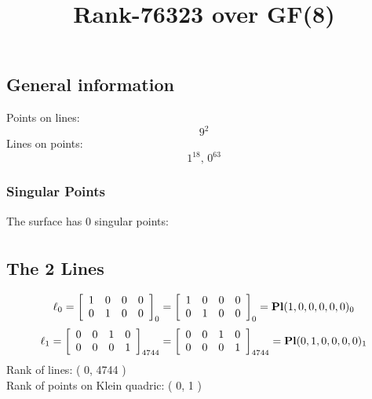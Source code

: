 \documentclass{article}
\newcommand\setTBstruts{\def\T{\rule{0pt}{2.6ex}}%
\def\B{\rule[-1.2ex]{0pt}{0pt}}}
\begin{document}
 
\setTBstruts



{\allowdisplaybreaks%






\title{Rank-76323 over GF(8)}
\author{}%
\maketitle%
%
{}



\subsection*{General information}
Points on lines:
$$
9^2$$
Lines on points:
$$
1^{18},\,0^{63}$$
\subsubsection*{Singular Points}
The surface has 0 singular points:\\
\begin{align*}
\end{align*}
\subsection*{The 2 Lines}
$$
\ell_{0} = 
\left[
\begin{array}{*{4}{r}}
1 & 0 & 0 & 0\\
0 & 1 & 0 & 0\\
\end{array}
\right]
_{0}
=
\left[
\begin{array}{*{4}c}
1  & 0  & 0  & 0\\
0  & 1  & 0  & 0\\
\end{array}
\right]_{0}
={\rm\bf Pl}(1,0,0,0,0,0 )_{0}$$
$$
\ell_{1} = 
\left[
\begin{array}{*{4}{r}}
0 & 0 & 1 & 0\\
0 & 0 & 0 & 1\\
\end{array}
\right]
_{4744}
=
\left[
\begin{array}{*{4}c}
0  & 0  & 1  & 0\\
0  & 0  & 0  & 1\\
\end{array}
\right]_{4744}
={\rm\bf Pl}(0,1,0,0,0,0 )_{1}$$
Rank of lines: ( 0, 4744 )\\
Rank of points on Klein quadric: ( 0, 1 )\\
}
\end{document}
